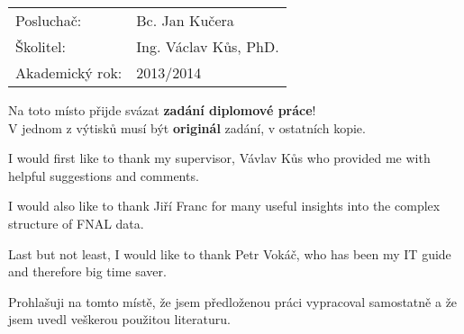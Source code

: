 \begin{tabular}{ll} 
{\Large Posluchač:} & {\Large Bc. Jan Kučera} \\[1mm]
{\Large \v{S}kolitel:} & {\Large Ing. Václav Kůs, PhD.} \\[2mm]
{\Large Akademický rok:}     & {\Large 2013/2014}
\end{tabular}


\newpage

\thispagestyle{empty}

\noindent
{\Large
Na toto místo přijde svázat \textbf{zadání diplomové práce}!\\
V jednom z výtisků musí být \textbf{originál} zadání, v ostatních kopie.\par}


\newpage

\thispagestyle{empty}



\vspace{1.5cm}


I would first like to thank my supervisor, Vávlav Kůs who provided me with helpful suggestions and comments. 

I would also like to thank Jiří Franc for many useful insights into the complex structure of FNAL data.

Last but not least, I would like to thank  Petr Vokáč, who has been my IT guide and therefore big time saver. 

\vspace{2.5cm}



\newpage

\thispagestyle{empty}



\vspace{0.5cm}

Prohlašuji na tomto místě, že jsem předloženou práci vypracoval samostatně 
a že jsem uvedl veškerou použitou literaturu.

